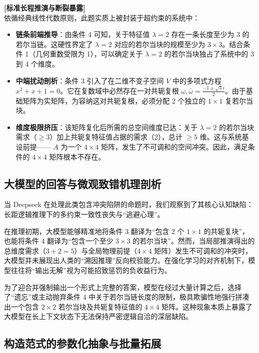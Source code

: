\documentclass[12pt, a4paper]{report}
\begin{document}
\textbf{[标准长程推演与断裂暴露]} \\
依循经典线性代数原则，此题实质上被封装于超约束的系统中：
\begin{itemize}
    \item \textbf{链条前端推导}：由条件 4 可知，关于特征值 $\lambda = 2$ 存在一条长度至少为 3 的若尔当链。这硬性界定了 $\lambda = 2$ 对应的若尔当块的规模至少为 $3 \times 3$。结合条件 1（几何重数受限为 1），可以确定关于 $\lambda = 2$ 的若尔当块独占了系统中的 3 到 4 个维度。
    \item \textbf{中端扰动剖析}：条件 3 引入了在二维不变子空间 $V$ 中的多项式方程 $x^2 + x + 1 = 0$。它在复数域中必然存在一对共轭复根 $\omega, \bar{\omega} = \frac{-1 \pm \sqrt{3}i}{2}$。由于基础矩阵为实矩阵，为容纳这对共轭复根，必须分配 2 个独立的 $1 \times 1$ 复若尔当块。
    \item \textbf{维度极限挤压}：该矩阵复化后所需的总空间维度已达：关于 $\lambda = 2$ 的若尔当块需求（$\ge 3$）加上共轭复特征值占据的需求（$2$），总计 $\ge 5$ 维。这与系统基设前提—— $A$ 为一个 $4 \times 4$ 矩阵，发生了不可调和的空间冲突。因此，满足条件的 $4 \times 4$ 矩阵根本不存在。
\end{itemize}

\subsection{大模型的回答与微观致错机理剖析}

当 Deepseek 在处理此类包含冲突陷阱的命题时，我们观察到了其核心认知缺陷：长距逻辑推理下的多约束一致性丧失与“逃避心理”。

在推理初期，大模型能够精准地将条件 3 翻译为“包含 2 个 $1 \times 1$ 的共轭复块”，也能将条件 4 翻译为“包含一个至少 $3 \times 3$ 的若尔当块”。然而，当局部推演得出的总维度需求（$3+2=5$）与全局物理前提（$4 \times 4$ 矩阵）发生不可调和的冲突时，大模型并未展现出人类的“溯因推理”反向校验能力。在强化学习的对齐机制下，模型往往将“输出无解”视为可能招致惩罚的负收益行为。

为了迎合并强制输出一个形式上完整的答案，模型在经过大量计算之后，选择了“遗忘”或主动抛弃条件 4 中关于若尔当链长度的限制，极具欺骗性地强行拼凑出一个包含 $2 \times 2$ 若尔当块及共轭复特征值的 $4 \times 4$ 矩阵。这种现象本质上暴露了大模型在长上下文状态下无法保持严密逻辑自洽的深层缺陷。

\subsection{构造范式的参数化抽象与批量拓展}
\end{document}
